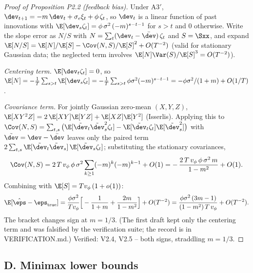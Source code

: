 \begin{proof}[Proof of Proposition P2.2 (feedback bias)]
Under A3$'$, $\dev_{t+1} = -m\,\dev_t + \sigma_e \xi_t + \phi\,\zeta_t$, so
$\dev_t$ is a linear function of past innovations with
$\E[\dev_s \zeta_t] = \phi\,\sigma^2\,(-m)^{s-t-1}$ for $s > t$ and $0$
otherwise. Write the slope error as $N/S$ with
$N = \sum_t (\dev_t - \bar\dev)\,\zeta_t$ and $S = \Sxx$, and expand
$\E[N/S] = \E[N]/\E[S] - \Cov(N, S)/\E[S]^2 + O(T^{-2})$ (valid for
stationary Gaussian data; the neglected term involves
$\E[N]\Var(S)/\E[S]^3 = O(T^{-2})$).

\emph{Centering term.} $\E[\dev_t \zeta_t] = 0$, so
$\E[N] = -\tfrac{1}{T}\sum_{s>t}\E[\dev_s\zeta_t]
= -\tfrac{1}{T}\sum_{s>t}\phi\sigma^2(-m)^{s-t-1}
= -\phi\sigma^2/(1+m) + O(1/T)$.

\emph{Covariance term.} For jointly Gaussian zero-mean $(X, Y, Z)$,
$\E[XY^2Z] = 2\,\E[XY]\E[YZ] + \E[XZ]\E[Y^2]$ (Isserlis). Applying this to
$\Cov(N, S) = \sum_{t,s}\big(\E[\tilde\dev_t \tilde\dev_s^2 \zeta_t] -
\E[\tilde\dev_t\zeta_t]\E[\tilde\dev_s^2]\big)$ with
$\tilde\dev = \dev - \bar\dev$ leaves only the paired term
$2\sum_{t,s}\E[\tilde\dev_t\tilde\dev_s]\,\E[\tilde\dev_s\zeta_t]$;
substituting the stationary covariances,
\[
\Cov(N,S) = 2\,T\,v_\phi\,\phi\,\sigma^2 \sum_{k \ge 1} (-m)^{k}(-m)^{k-1}
 + O(1)
 = -\,\frac{2\,T\,v_\phi\,\phi\,\sigma^2\,m}{1-m^2} + O(1).
\]
Combining with $\E[S] = T v_\phi\,(1+o(1))$:
\[
\E[\hat\eps - \eps_{\mathrm{true}}]
 = \frac{\phi\sigma^2}{T v_\phi}\Big[-\frac{1}{1+m} + \frac{2m}{1-m^2}\Big]
 + O(T^{-2})
 = \frac{\phi\sigma^2\,(3m-1)}{(1-m^2)\,T\,v_\phi} + O(T^{-2}).
\]
The bracket changes sign at $m = 1/3$. (The first draft kept only the
centering term and was falsified by the verification suite; the record is
in VERIFICATION.md.) Verified: V2.4, V2.5 -- both signs, straddling
$m = 1/3$.
\end{proof}

\subsection*{D. Minimax lower bounds}

